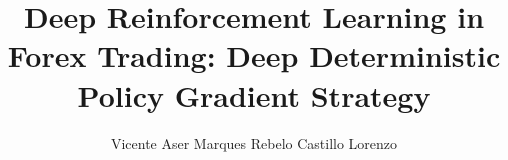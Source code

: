 \documentclass[a4paper]{article}
\begin{document}
\title{Deep Reinforcement Learning in Forex Trading: Deep Deterministic Policy Gradient Strategy}
\author{Vicente Aser Marques Rebelo Castillo Lorenzo}

\maketitle
\thispagestyle{empty}

\setlength{\abstitleskip}{-\absparindent}


\tableofcontents
\thispagestyle{empty}
\clearpage













\clearpage
{}
\normalem

\ULforem

\end{document}
